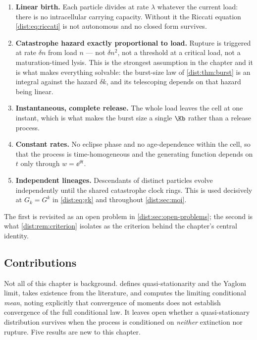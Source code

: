 \begin{enumerate}[leftmargin=*,itemsep=2pt]
\item \textbf{Linear birth.} Each particle divides at rate $\lambda$ whatever
the current load: there is no intracellular carrying capacity. Without it the
Riccati equation \cref{dist:eq:riccati} is not autonomous and no closed form
survives.
\item \textbf{Catastrophe hazard exactly proportional to load.} Rupture is
triggered at rate $\delta n$ from load $n$ --- not $\delta n^2$, not a
threshold at a critical load, not a maturation-timed lysis. This is the
strongest assumption in the chapter and it is what makes everything solvable:
the burst-size law of \cref{dist:thm:burst} is an integral against the hazard
$\delta k$, and its telescoping depends on that hazard being linear.
\item \textbf{Instantaneous, complete release.} The whole load leaves the cell
at one instant, which is what makes the burst size a single \rv{} $\Kb$ rather
than a release process.
\item \textbf{Constant rates.} No eclipse phase and no age-dependence within
the cell, so that the process is time-homogeneous and the generating function
depends on $t$ only through $w=\ee^{\theta t}$.
\item \textbf{Independent lineages.} Descendants of distinct particles evolve
independently until the shared catastrophe clock rings. This is used
decisively at $G_k=G^k$ in \cref{dist:eq:gk} and throughout
\cref{dist:sec:moi}.
\end{enumerate}

The first is revisited as an open problem in \cref{dist:sec:open-problems};
the second is what \cref{dist:rem:criterion} isolates as the criterion behind
the chapter's central identity.

\subsection{Contributions}
\label{dist:sec:contributions}

Not all of this chapter is background. \ChMcap{} defines quasi-stationarity and
the Yaglom limit, takes existence from the literature, and computes the
limiting conditional \emph{mean}, noting explicitly that convergence of
moments does not establish convergence of the full conditional law. It leaves
open whether a quasi-stationary distribution survives when the process is
conditioned on
\emph{neither} extinction nor rupture. Five results are new to this chapter.

